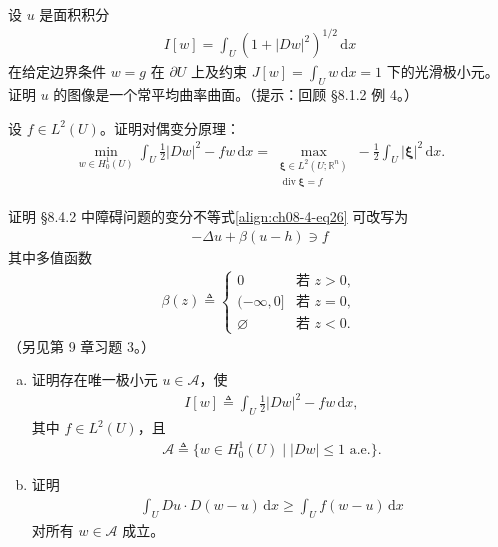 \documentclass[../../main.tex]{subfiles}
\begin{document}
\begin{exercise}\label{exercise:ch08-7-12}
设 $u$ 是面积积分
\begin{align*}
I[w]=\int_U(1+|Dw|^2)^{1/2}\,\mathrm{d}x
\end{align*}
在给定边界条件 $w=g$ 在 $\partial U$ 上及约束 $J[w]=\int_U w\,\mathrm{d}x=1$ 下的光滑极小元。证明 $u$ 的图像是一个常平均曲率曲面。（提示：回顾 \S8.1.2 例 4。）
\end{exercise}

\begin{exercise}\label{exercise:ch08-7-13}
设 $f\in L^2(U)$。证明对偶变分原理：
\begin{align*}
\min_{w\in H_0^1(U)}\int_U\frac12|Dw|^2-fw\,\mathrm{d}x=\max_{\substack{\boldsymbol{\xi}\in L^2(U;\mathbb{R}^n)\\\operatorname{div}\boldsymbol{\xi}=f}}-\frac12\int_U|\boldsymbol{\xi}|^2\,\mathrm{d}x.
\end{align*}
\end{exercise}

\begin{exercise}[多值 PDE]\label{exercise:ch08-7-14}证明 \S8.4.2 中障碍问题的变分不等式\eqref{align:ch08-4-eq26} 可改写为
\begin{align*}
-\Delta u+\beta(u-h)\ni f
\end{align*}
其中多值函数
\begin{align*}
\beta(z)\triangleq\begin{cases}0&\text{若 }z>0,\\(-\infty,0]&\text{若 }z=0,\\\varnothing &\text{若 }z<0.\end{cases}
\end{align*}
（另见第 9 章习题 3。）
\end{exercise}

\begin{exercise}[逐点梯度约束]\label{exercise:ch08-7-15}
\begin{enumerate}[(a)]
\item 证明存在唯一极小元 $u\in\mathcal{A}$，使
\begin{align*}
I[w]\triangleq\int_U\frac12|Dw|^2-fw\,\mathrm{d}x,
\end{align*}
其中 $f\in L^2(U)$，且
\begin{align*}
\mathcal{A}\triangleq\{w\in H_0^1(U)\mid |Dw|\leqslant 1\text{ a.e.}\}.
\end{align*}
\item 证明
\begin{align*}
\int_U Du\cdot D(w-u)\,\mathrm{d}x\geqslant\int_U f(w-u)\,\mathrm{d}x
\end{align*}
对所有 $w\in\mathcal{A}$ 成立。
\end{enumerate}
\end{exercise}
\end{document}
